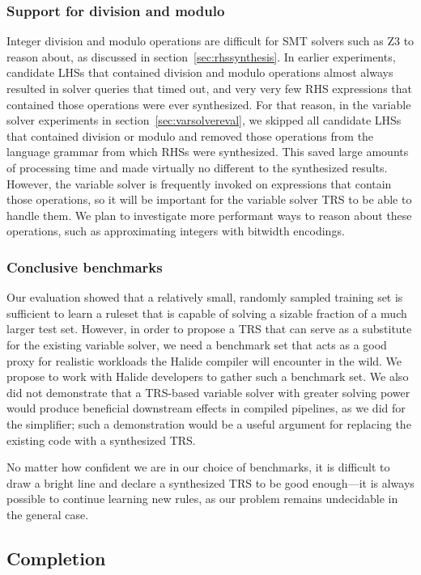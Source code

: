 \subsubsection{Support for division and modulo}
Integer division and modulo operations are difficult for SMT solvers such as Z3 to reason about, as discussed in section~\ref{sec:rhssynthesis}. In earlier experiments, candidate LHSs that contained division and modulo operations almost always resulted in solver queries that timed out, and very very few RHS expressions that contained those operations were ever synthesized. For that reason, in the variable solver experiments in section~\ref{sec:varsolvereval}, we skipped all candidate LHSs that contained division or modulo and removed those operations from the language grammar from which RHSs were synthesized. This saved large amounts of processing time and made virtually no different to the synthesized results. However, the variable solver is frequently invoked on expressions that contain those operations, so it will be important for the variable solver TRS to be able to handle them. We plan to investigate more performant ways to reason about these operations, such as approximating integers with bitwidth encodings.

\subsubsection{Conclusive benchmarks}
Our evaluation showed that a relatively small, randomly sampled training set is sufficient to learn a ruleset that is capable of solving a sizable fraction of a much larger test set. However, in order to propose a TRS that can serve as a substitute for the existing variable solver, we need a benchmark set that acts as a good proxy for realistic workloads the Halide compiler will encounter in the wild. We propose to work with Halide developers to gather such a benchmark set. We also did not demonstrate that a TRS-based variable solver with greater solving power would produce beneficial downstream effects in compiled pipelines, as we did for the simplifier; such a demonstration would be a useful argument for replacing the existing code with a synthesized TRS.

No matter how confident we are in our choice of benchmarks, it is difficult to draw a bright line and declare a synthesized TRS to be good enough---it is always possible to continue learning new rules, as our problem remains undecidable in the general case. 

\subsection{Completion}
\label{sec:completion}

